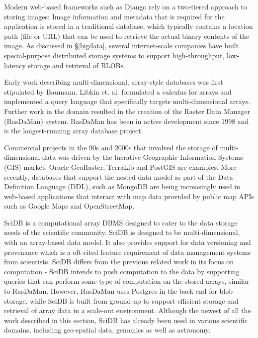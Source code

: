 \documentclass[letterpaper,twocolumn,10pt]{article}
\begin{document}
Modern web-based frameworks such as Django \cite{django} rely on a two-tiered approach to storing images: Image information and metadata that is required for the application is stored in a traditional database, which typically contains a location path (file or URL) that can be used to retrieve the actual binary contents of the image. As discussed in \S\ref{bigdata}, several internet-scale companies have built special-purpose distributed storage systems to support high-throughput, low-latency storage and retrieval of BLOBs. 

Early work describing multi-dimensional, array-style databases was first stipulated by Baumann\cite{baumann}. Libkin et. al.\cite{Libkin:1996} formulated a calculus for arrays and implemented a query language that specifically targets multi-dimensional arrays. Further work in the domain resulted in the creation of the Raster Data Manager (RasDaMan) system\cite{Baumann:1998,Rasdaman}. RasDaMan has been in active development since 1998 and is the longest-running array database project.  

Commercial projects in the 90s and 2000s that involved the storage of multi-dimensional data was driven by the lucrative Geographic Information Systems (GIS) market. Oracle GeoRaster\cite{oracle}, TerraLib\cite{camara2008terralib} and PostGIS\cite{obe2011postgis} are examples. More recently, databases that support the nested data model as part of the Data Definition Language (DDL), such as MongoDB are being increasingly used in web-based applications that interact with map data provided by public map APIs such as Google Maps and OpenStreetMap.

SciDB\cite{stonebraker2013scidb} is a computational array DBMS designed to cater to the data storage needs of the scientific community. SciDB is designed to be multi-dimensional, with an array-based data model. It also provides support for data versioning and provenance which is a oft-cited feature requirement of data management systems from scientists. SciDB differs from the previous related work in its focus on computation - SciDB intends to push computation to the data by supporting queries that can perform some type of computation on the stored arrays, similar to RasDaMan. However, RasDaMan uses Postgres in the back-end for blob storage, while SciDB is built from ground-up to support efficient storage and retrieval of array data in a scale-out environment. Although the newest of all the work described in this section, SciDB has already been used in various scientific domains, including geo-spatial data, genomics\cite{stonebraker2011architecture} as well as astronomy\cite{Cudre-Mauroux:2009:DSS:1687553.1687584}. 
\end{document}
